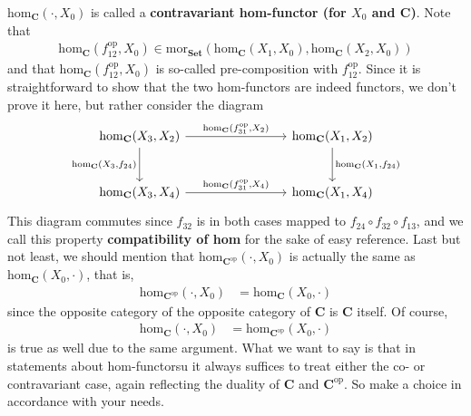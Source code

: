$\mathrm{hom}_{\mathbf{C}}(\cdot,X_{0})$ is called a \textbf{contravariant hom-functor (for $X_{0}$ and $\mathbf{C}$)}.
Note that
\begin{align*}
  \mathrm{hom}_{\mathbf{C}}(f_{12}^{\mathrm{op}},X_{0})
  \in
  \mathrm{mor}_{\mathbf{Set}}
  \left(
    \mathrm{hom}_{\mathbf{C}}(X_{1},X_{0}),
    \mathrm{hom}_{\mathbf{C}}(X_{2},X_{0})
  \right)
\end{align*}
and that $\mathrm{hom}_{\mathbf{C}}(f_{12}^{\mathrm{op}},X_{0})$ is so-called pre-composition with $f_{12}^{\mathrm{op}}$.
Since it is straightforward to show that the two hom-functors are indeed functors, we don't prove it here, but rather consider the diagram
\[
\begin{tikzcd}[row sep=large,column sep=8em]
  \mathrm{hom}_{\mathbf{C}}(X_{3},X_{2})
  \arrow{r}{\mathrm{hom}_{\mathbf{C}}(f_{31}^{\mathrm{op}},X_{2})}
  \arrow[swap]{d}{\mathrm{hom}_{\mathbf{C}}(X_{3},f_{24})}
  &
  \mathrm{hom}_{\mathbf{C}}(X_{1},X_{2})
  \arrow{d}{\mathrm{hom}_{\mathbf{C}}(X_{1},f_{24})}
  \\
  \mathrm{hom}_{\mathbf{C}}(X_{3},X_{4})
  \arrow{r}{\mathrm{hom}_{\mathbf{C}}(f_{31}^{\mathrm{op}},X_{4})}
  &
  \mathrm{hom}_{\mathbf{C}}(X_{1},X_{4})
\end{tikzcd}
\]
This diagram commutes since $f_{32}$ is in both cases mapped to $f_{24} \circ f_{32} \circ f_{13}$, and we call this property \textbf{compatibility of hom} for the sake of easy reference.
Last but not least, we should mention that $\mathrm{hom}_{\mathbf{C}^{\mathrm{op}}}(\cdot,X_{0})$ is actually the same as $\mathrm{hom}_{\mathbf{C}}(X_{0},\cdot)$, that is,
\begin{align*}
  \mathrm{hom}_{\mathbf{C}^{\mathrm{op}}}(\cdot,X_{0})
  &=
  \mathrm{hom}_{\mathbf{C}}(X_{0},\cdot)
\end{align*}
since the opposite category of the opposite category of $\mathbf{C}$ is $\mathbf{C}$ itself.
Of course,
\begin{align*}
  \mathrm{hom}_{\mathbf{C}}(\cdot,X_{0})
  &=
  \mathrm{hom}_{\mathbf{C}^{\mathrm{op}}}(X_{0},\cdot)
\end{align*}
is true as well due to the same argument.
What we want to say is that in statements about hom-functorsu it always suffices to treat either the co- or contravariant case, again reflecting the duality of $\mathbf{C}$ and $\mathbf{C}^{\mathrm{op}}$.
So make a choice in accordance with your needs.
